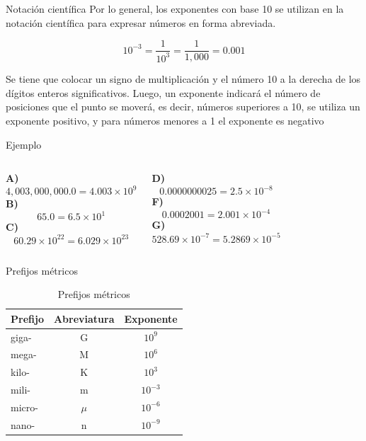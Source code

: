 \documentclass[12pt, aspectratio=169]{beamer}
\newcommand{\col}{\column{0.5\textwidth}}
\begin{document}
\begin{frame}{Notaci\'on cient\'ifica}
	Por lo general, los exponentes con base 10 se utilizan en la notaci\'on cient\'ifica para expresar n\'umeros en forma abreviada.
	
	$$10^{-3} = \frac{1}{10^3} = \frac{1}{1,000} = 0.001$$
	
\end{frame}

\begin{frame}
	
	Se tiene que colocar un signo de multiplicaci\'on y el n\'umero 10 a la derecha de los d\'igitos enteros significativos. Luego, un exponente indicar\'a el n\'umero de posiciones que el punto se mover\'a, es decir, n\'umeros superiores a 10, se utiliza un exponente positivo, y para n\'umeros menores a 1 el exponente es negativo	
\end{frame}

\begin{frame}[t]{Ejemplo}
	\begin{columns}
		\col
		\textbf{A)}
		$$4,003,000,000.0 = 4.003 \times 10^9 $$
		\textbf{B)}
		$$65.0 = 6.5 \times 10^1$$
		\textbf{C)}
		$$60.29 \times 10^{22} = 6.029 \times 10^{23}$$
				
		\col
		\textbf{D)}
		$$0.0000000025 = 2.5 \times 10^{-8}$$
		\textbf{F)}
		$$0.0002001 = 2.001 \times 10^{-4}$$
		\textbf{G)}
		$$528.69 \times 10^{-7} = 5.2869 \times 10^{-5}$$
				
	\end{columns}
	
\end{frame}

\begin{frame}{Prefijos m\'etricos} 
	
	\begin{table}
		\caption{Prefijos m\'etricos}
		\begin{tabular}{lcc}
			\hline
			Prefijo & Abreviatura & Exponente \\
			\hline
			giga- & G & $10^9$ \\
			mega- & M & $10^6$ \\
			kilo- & K & $10^3$ \\
			mili- & m  & $10^{-3}$ \\
			micro- & $\mu$  & $10^{-6}$ \\
			nano- & n & $10^{-9}$ \\
			\hline
		\end{tabular}
	\end{table}
	
\end{frame}
\end{document}
